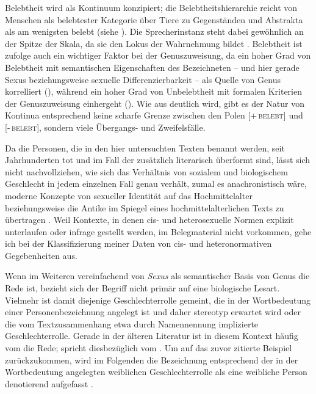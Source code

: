 Belebtheit wird als Kontinuum konzipiert; die Belebtheitshierarchie reicht von
Menschen als belebtester Kategorie über Tiere zu Gegenständen und Abstrakta als
am wenigsten belebt (siehe ). Die Sprecherinstanz steht
dabei gewöhnlich an der Spitze der Skala, da sie den Lokus der Wahrnehmung
bildet \autocites%
	{silverstein1976}%
	[185--200]{comrie1989}%
	[203]{bossong1998}%
	[40--46]{siewierska2004}%
	[439--441]{bickel2011}%
	[63--79]{kotthoffnuebling2018}. %
Belebtheit ist \citet[101--102, 110--112]{dahl1999} zufolge auch ein wichtiger
Faktor bei der Genuszuweisung, da ein hoher Grad von Belebtheit mit
semantischen Eigenschaften des Bezeichneten -- und hier gerade Sexus
beziehungsweise sexuelle Differenzierbarkeit -- als Quelle von Genus
korrelliert (), während ein hoher Grad von Unbelebtheit
mit formalen Kriterien der Genuszuweisung einhergeht (). Wie
aus  deutlich wird, gibt es der Natur von Kontinua
entsprechend keine scharfe Grenze zwischen den Polen
\textsc{[+\,belebt]} und \textsc{[-\,belebt]}, sondern viele
Übergangs- und Zweifelsfälle.

Da die Personen, die in den hier untersuchten Texten benannt werden, seit
Jahrhunderten tot und im Fall der \KC{} zusätzlich literarisch
überformt sind, lässt sich nicht nachvollziehen, wie sich das Verhältnis von
sozialem und biologischem Geschlecht in jedem einzelnen Fall genau verhält,
zumal es anachronistisch wäre, moderne Konzepte von sexueller Identität auf das
Hochmittelalter beziehungsweise die Antike im Spiegel eines
hochmittelalterlichen Texts zu übertragen \autocite[siehe
z.\,B.][]{klinger2002}. Weil Kontexte, in denen cis- und heterosexuelle Normen
explizit unterlaufen oder infrage gestellt werden, im Belegmaterial nicht
vorkommen, gehe ich bei der Klassifizierung meiner Daten von cis- und
heteronormativen Gegebenheiten aus.

Wenn im Weiteren vereinfachend von \textit{Sexus} als semantischer Basis von
Genus die Rede ist, bezieht sich der Begriff nicht primär auf eine biologische
Lesart. Vielmehr ist damit diejenige Geschlechter\-rolle gemeint, die in der
Wortbedeutung einer Personenbezeichnung angelegt ist und daher stereotyp
erwartet wird oder die vom Textzusammenhang etwa durch Namennennung implizierte
Geschlechterrolle. Gerade in der älteren Literatur ist in diesem Kontext häufig
vom  die Rede; \citet[67]{panther2009} spricht
diesbezüglich vom . Um auf das zuvor zitierte Beispiel
zurückzukommen, wird im Folgenden die Bezeichnung  entsprechend der
in der Wortbedeutung angelegten weiblichen Geschlechterrolle als eine weibliche
Person denotierend aufgefasst
\autocite[vgl.][s.\,v.~]{duden-online}.

